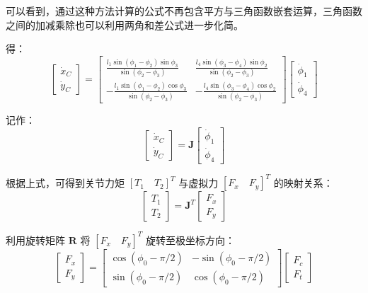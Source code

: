 可以看到，通过这种方法计算的公式不再包含平方与三角函数嵌套运算，三角函数之间的加减乘除也可以利用两角和差公式进一步化简。

得：
\begin{equation}
    \begin{bmatrix}
        \dot{x}_C \\ \dot{y}_C
    \end{bmatrix} = 
    \begin{bmatrix}
        \frac{l_1 \sin(\phi_1 - \phi_2) \sin \phi_3}{\sin(\phi_2 - \phi_3)} & \frac{l_4 \sin(\phi_3 - \phi_4) \sin \phi_2}{\sin(\phi_2 - \phi_3)} \\
        -\frac{l_1 \sin(\phi_1 - \phi_2) \cos \phi_3}{\sin(\phi_2 - \phi_3)} & -\frac{l_4 \sin(\phi_3 - \phi_4) \cos \phi_2}{\sin(\phi_2 - \phi_3)}
    \end{bmatrix}
    \begin{bmatrix}
        \dot{\phi}_1 \\ \dot{\phi}_4
    \end{bmatrix}
    \label{eq:jacob_full}
\end{equation}

记作：
\begin{equation}
    \begin{bmatrix}
        \dot{x}_C \\ \dot{y}_C
    \end{bmatrix} = \boldsymbol{J}
    \begin{bmatrix}
        \dot{\phi}_1 \\ \dot{\phi}_4
    \end{bmatrix}
\end{equation}

根据上式，可得到关节力矩 $[T_1 \quad T_2]^T$ 与虚拟力 $[F_x \quad F_y]^T$ 的映射关系：
\begin{equation}
    \begin{bmatrix}
        T_1 \\ T_2
    \end{bmatrix} = \boldsymbol{J}^T
    \begin{bmatrix}
        F_x \\ F_y
    \end{bmatrix}
\end{equation}

利用旋转矩阵 $\boldsymbol{R}$ 将 $[F_x \quad F_y]^T$ 旋转至极坐标方向：
\begin{equation}
    \begin{bmatrix}
        F_x \\ F_y
    \end{bmatrix} = 
    \begin{bmatrix}
        \cos(\phi_0 - \pi/2) & -\sin(\phi_0 - \pi/2) \\
        \sin(\phi_0 - \pi/2) & \cos(\phi_0 - \pi/2)
    \end{bmatrix}
    \begin{bmatrix}
        F_c \\ F_t
    \end{bmatrix}
\end{equation}

